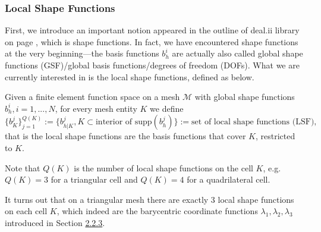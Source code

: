 	\subsubsection*{Local Shape Functions}
	First, we introduce an important notion appeared in the outline of 
	deal.ii library on page \pageref{deal.ii outline}, which is shape 
	functions. In fact, we have encountered shape functions at the very 
	beginning---the basis functions $b_h^i$ are actually also called global 
	shape functions (GSF)/global basis functions/degrees of freedom (DOFs).
	What we are currently interested in is the local shape functions, defined
	as below.
	\begin{mdframed}[linecolor=blue,linewidth=.5pt,roundcorner=10pt,%
		innertopmargin=0pt]
	\begin{definition}\label{def:LSF}
		Given a finite element function space on a mesh $\mathcal{M}$ with 
		global shape functions $b_h^i,i=1,...,N$, for every mesh entity $K$
		we define 
		\[\{b_K^j\}_{j=1}^{Q(K)}:=\{b_{h|K}^j, K\subset\textrm{interior of 
			supp}(b_h^j)\}:=\textrm{set of local shape functions (LSF)},\]
		that is the local shape functions are the basis functions that cover
		$K$, restricted to $K$.
	\end{definition}
	\end{mdframed}
	
	Note that $Q(K)$ is the number of local shape functions on the cell $K$, 
	e.g. $Q(K)=3$ for a triangular cell and $Q(K)=4$ for a quadrilateral cell.
	
	It turns out that on a triangular mesh there are exactly 3 local shape 
	functions on each cell $K$, which indeed are the barycentric coordinate
	functions $\lambda_1,\lambda_2,\lambda_3$ introduced in Section 
	\hyperref[subsubsection.2.2.3]{2.2.3}.
		

